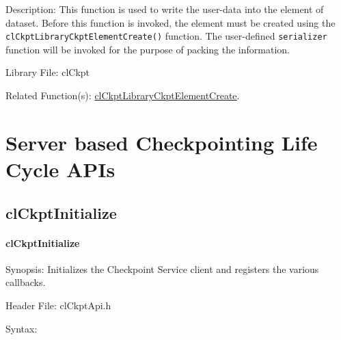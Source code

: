 \begin{flushleft}
\begin{Desc}
\item[Description:]This function is used to write the user-data into the element of dataset. Before this function is invoked, the element must be 
created using the {\tt{clCkptLibraryCkptElementCreate()}} function. The user-defined {\tt{serializer}} function will be
invoked for the purpose of packing the information.\end{Desc}
\begin{Desc}
\item[Library File:]cl\-Ckpt\end{Desc}
\begin{Desc}
\item[Related Function(s):]\hyperlink{pageckpt211}{cl\-Ckpt\-Library\-Ckpt\-Element\-Create}. \end{Desc}




\section{Server based Checkpointing Life Cycle APIs}

\subsection{clCkptInitialize}
\hypertarget{pageckpt101}{}\paragraph{cl\-Ckpt\-Initialize}\label{pageckpt101}
\begin{Desc}
\item[Synopsis:]Initializes the Checkpoint Service client and registers the various callbacks.\end{Desc}
\begin{Desc}
\item[Header File:]clCkptApi.h\end{Desc}
\begin{Desc}
\item[Syntax:]


\end{Desc}
\end{flushleft}
